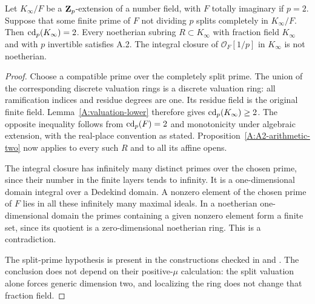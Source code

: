 \begin{corollary}
\label{A:A2-split-tower-exclusion}
Let $K_\infty/F$ be a $\mathbf Z_p$-extension of a number field, with $F$
totally imaginary if $p=2$. Suppose that some finite prime of $F$
not dividing $p$ splits completely in $K_\infty/F$. Then
$\operatorname{cd}_p(K_\infty)=2$. Every noetherian subring $R\subset K_\infty$
with fraction field $K_\infty$ and with $p$ invertible satisfies A.2.
The integral closure of $\mathcal O_F[1/p]$ in $K_\infty$ is not
noetherian.
\end{corollary}
\begin{proof}
Choose a compatible prime over the completely split prime.
The union of the corresponding discrete valuation rings is a
discrete valuation ring: all ramification indices and residue
degrees are one. Its residue field is the original finite field.
Lemma~\ref{A:valuation-lower} therefore gives
$\operatorname{cd}_p(K_\infty)\geq2$. The opposite inequality follows from
$\operatorname{cd}_p(F)=2$ and monotonicity under algebraic extension, with the
real-place convention as stated. Proposition~\ref{A:A2-arithmetic-two}
now applies to every such $R$ and to all its affine opens.

The integral closure has infinitely many distinct primes over the
chosen prime, since their number in the finite layers tends to
infinity. It is a one-dimensional domain integral over a Dedekind
domain. A nonzero element of the chosen prime of $F$ lies in all
these infinitely many maximal ideals. In a noetherian
one-dimensional domain the primes containing a given nonzero
element form a finite set, since its quotient is a zero-dimensional
noetherian ring. This is a contradiction.

The split-prime hypothesis is present in the constructions checked
in \citet[Proposition 3.1 and Corollary 3.2, pp.~11--12]{A_HajirMaire}
and \citet[Lemma 1 and \S3, Theorem 2]{A_HubbardWashington}.
The conclusion does not depend on their positive-$\mu$ calculation:
the split valuation alone forces generic dimension two, and
localizing the ring does not change that fraction field.
\end{proof}


